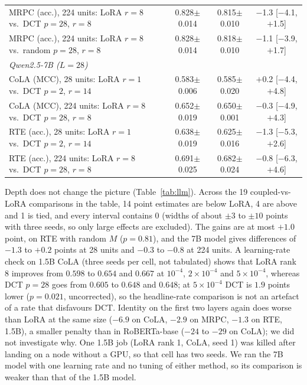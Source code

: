 \documentclass{article}
\theoremstyle{plain}
\begin{document}
\begin{table}[h]
{\begin{tabular}{lccc}
MRPC (acc.), 224 units: LoRA $r=8$ vs.\ DCT $p=28$, $r=8$ & 0.828$\pm$0.014 & 0.815$\pm$0.010 & $-$1.3 [$-$4.1, $+$1.5] \\
MRPC (acc.), 224 units: LoRA $r=8$ vs.\ random $p=28$, $r=8$ & 0.828$\pm$0.014 & 0.818$\pm$0.010 & $-$1.1 [$-$3.9, $+$1.7] \\
\midrule
\multicolumn{4}{l}{\emph{Qwen2.5-7B ($L=28$)}} \\
CoLA (MCC), 28 units: LoRA $r=1$ vs.\ DCT $p=2$, $r=14$ & 0.583$\pm$0.006 & 0.585$\pm$0.020 & $+$0.2 [$-$4.4, $+$4.8] \\
CoLA (MCC), 224 units: LoRA $r=8$ vs.\ DCT $p=28$, $r=8$ & 0.652$\pm$0.019 & 0.650$\pm$0.001 & $-$0.3 [$-$4.9, $+$4.3] \\
RTE (acc.), 28 units: LoRA $r=1$ vs.\ DCT $p=2$, $r=14$ & 0.638$\pm$0.019 & 0.625$\pm$0.016 & $-$1.3 [$-$5.3, $+$2.6] \\
RTE (acc.), 224 units: LoRA $r=8$ vs.\ DCT $p=28$, $r=8$ & 0.691$\pm$0.025 & 0.682$\pm$0.024 & $-$0.8 [$-$6.3, $+$4.6] \\
\bottomrule
\end{tabular}%
}
\end{table}

Depth does not change the picture (Table~\ref{tab:llm}).
Across the 19 coupled-vs-LoRA comparisons in the table, 14 point estimates are below LoRA, 4 are above and 1 is tied, and every interval contains 0 (widths of about $\pm3$ to $\pm10$ points with three seeds, so only large effects are excluded).
The gains are at most $+1.0$ point, on RTE with random $M$ ($p=0.81$), and the 7B model gives differences of $-1.3$ to $+0.2$ points at 28 units and $-0.3$ to $-0.8$ at 224 units.
A learning-rate check on 1.5B CoLA (three seeds per cell, not tabulated) shows that LoRA rank 8 improves from $0.598$ to $0.654$ and $0.667$ at $10^{-4}$, $2\times10^{-4}$ and $5\times10^{-4}$, whereas DCT $p=28$ goes from $0.605$ to $0.648$ and $0.648$; at $5\times10^{-4}$ DCT is $1.9$ points lower ($p=0.021$, uncorrected), so the headline-rate comparison is not an artefact of a rate that disfavours DCT.
Identity on the first two layers again does worse than LoRA at the same size ($-6.9$ on CoLA, $-2.9$ on MRPC, $-1.3$ on RTE, 1.5B), a smaller penalty than in RoBERTa-base ($-24$ to $-29$ on CoLA); we did not investigate why.
One 1.5B job (LoRA rank 1, CoLA, seed 1) was killed after landing on a node without a GPU, so that cell has two seeds.
We ran the 7B model with one learning rate and no tuning of either method, so its comparison is weaker than that of the 1.5B model.
\end{document}
